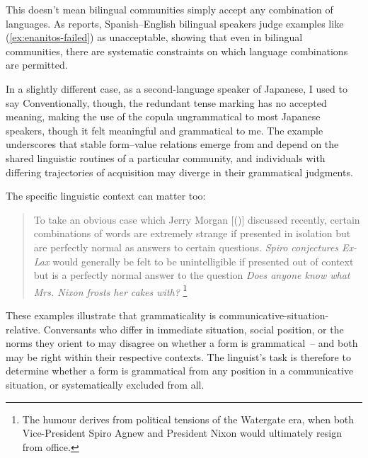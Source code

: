 \documentclass[12pt,letterpaper]{article}
\begin{document}
This doesn't mean bilingual communities simply accept any combination of languages. As \textcite{Toribio2001} reports, Spanish--English bilingual speakers judge examples like (\ref{ex:enanitos-failed}) as unacceptable, showing that even in bilingual communities, there are systematic constraints on which language combinations are permitted.

\label{ex:enanitos-failed}
\z

In a slightly different case, as a second-language speaker of Japanese, I used to say
\z
Conventionally, though, the redundant tense marking has no accepted meaning, making the use of the copula ungrammatical to most Japanese speakers, though it felt meaningful and grammatical to me. The example underscores that stable form--value relations emerge from and depend on the shared linguistic routines of a particular community, and individuals with differing trajectories of acquisition may diverge in their grammatical judgments.

The specific linguistic context can matter too:
\begin{quote}
To take an obvious case which Jerry Morgan [(\citeyear{morgan1973})] discussed recently, certain combinations of words are extremely strange if presented in isolation but are perfectly normal as answers to certain questions. \textit{Spiro conjectures Ex-Lax} would generally be felt to be unintelligible if presented out of context but is a perfectly normal answer to the question \textit{Does anyone know what Mrs. Nixon frosts her cakes with?} \autocite[252, italics added]{McCawley1974}\footnote{The humour derives from political tensions of the Watergate era, when both Vice-President Spiro Agnew and President Nixon would ultimately resign from office.}
\end{quote}

These examples illustrate that grammaticality is communicative-situation-relative. Conversants who differ in immediate situation, social position, or the norms they orient to may disagree on whether a form is grammatical~-- and both may be right within their respective contexts. The linguist's task is therefore to determine whether a form is grammatical from any position in a communicative situation, or systematically excluded from all.
\end{document}
